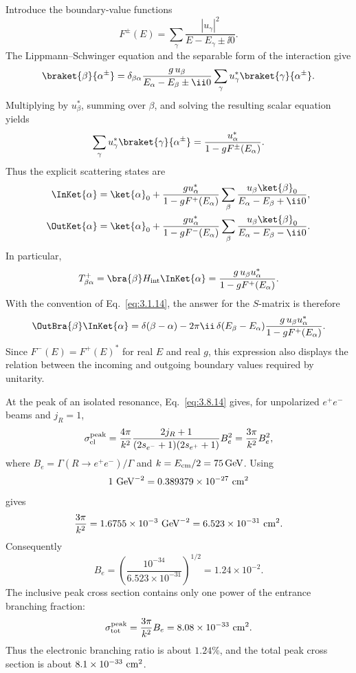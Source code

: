 \ExerciseEditorialNote

\begin{enumerate}
Introduce the boundary-value functions
\[
 F^\pm(E)=\sum_\gamma\frac{|u_\gamma|^2}
 {E-E_\gamma\pm \ii0}.
\]
The Lippmann--Schwinger equation and the separable form of the interaction
give
\[
 \braket{\beta}{\alpha^\pm}
 =\delta_{\beta\alpha}
 \frac{g\,u_\beta}{E_\alpha-E_\beta\pm \ii0}
 \sum_\gamma u_\gamma^*\braket{\gamma}{\alpha^\pm}.
\]
Multiplying by \(u_\beta^*\), summing over \(\beta\), and solving the
resulting scalar equation yields
\[
 \sum_\gamma u_\gamma^*\braket{\gamma}{\alpha^\pm}
 =\frac{u_\alpha^*}{1-gF^\pm(E_\alpha)}.
\]
Thus the explicit scattering states are
\[
 \begin{split}
 \InKet{\alpha}
 &=\ket{\alpha}_0+
 \frac{g u_\alpha^*}{1-gF^+(E_\alpha)}
 \sum_\beta\frac{u_\beta\ket{\beta}_0}
 {E_\alpha-E_\beta+\ii0},\\
 \OutKet{\alpha}
 &=\ket{\alpha}_0+
 \frac{g u_\alpha^*}{1-gF^-(E_\alpha)}
 \sum_\beta\frac{u_\beta\ket{\beta}_0}
 {E_\alpha-E_\beta-\ii0}.
 \end{split}
\]
In particular,
\[
 T^+_{\beta\alpha}
 =\bra{\beta}H_{\rm int}\InKet{\alpha}
 =\frac{g\,u_\beta u_\alpha^*}
 {1-gF^+(E_\alpha)}.
\]
With the convention of Eq.~\eqref{eq:3.1.14}, the answer for the
\(S\)-matrix is therefore
\[
 \OutBra{\beta}\InKet{\alpha}
 =\delta(\beta-\alpha)
 -2\pi \ii\,\delta(E_\beta-E_\alpha)
 \frac{g\,u_\beta u_\alpha^*}
 {1-gF^+(E_\alpha)}.
\]
Since \(F^-(E)=F^+(E)^*\) for real \(E\) and real \(g\), this expression
also displays the relation between the incoming and outgoing boundary
values required by unitarity.

At the peak of an isolated resonance, Eq.~\eqref{eq:3.8.14} gives, for
unpolarized \(e^+e^-\) beams and \(j_R=1\),
\[
 \sigma_{\rm el}^{\rm peak}
 =\frac{4\pi}{k^2}\frac{2j_R+1}
 {(2s_{e^-}+1)(2s_{e^+}+1)}B_e^2
 =\frac{3\pi}{k^2}B_e^2,
\]
where \(B_e=\Gamma(R\to e^+e^-)/\Gamma\) and
\(k=E_{\rm cm}/2=75\,{\rm GeV}\).  Using
\[
 1\ {\rm GeV}^{-2}=0.389379\times10^{-27}\ {\rm cm}^2
\]
gives
\[
 \frac{3\pi}{k^2}=1.6755\times10^{-3}\ {\rm GeV}^{-2}
 =6.523\times10^{-31}\ {\rm cm}^2.
\]
Consequently
\[
 B_e=\left(\frac{10^{-34}}{6.523\times10^{-31}}\right)^{1/2}
 =1.24\times10^{-2}.
\]
The inclusive peak cross section contains only one power of the entrance
branching fraction:
\[
 \sigma_{\rm tot}^{\rm peak}
 =\frac{3\pi}{k^2}B_e
 =8.08\times10^{-33}\ {\rm cm}^2.
\]
Thus the electronic branching ratio is about \(1.24\%\), and the total
peak cross section is about \(8.1\times10^{-33}\ {\rm cm}^2\).


\end{enumerate}
